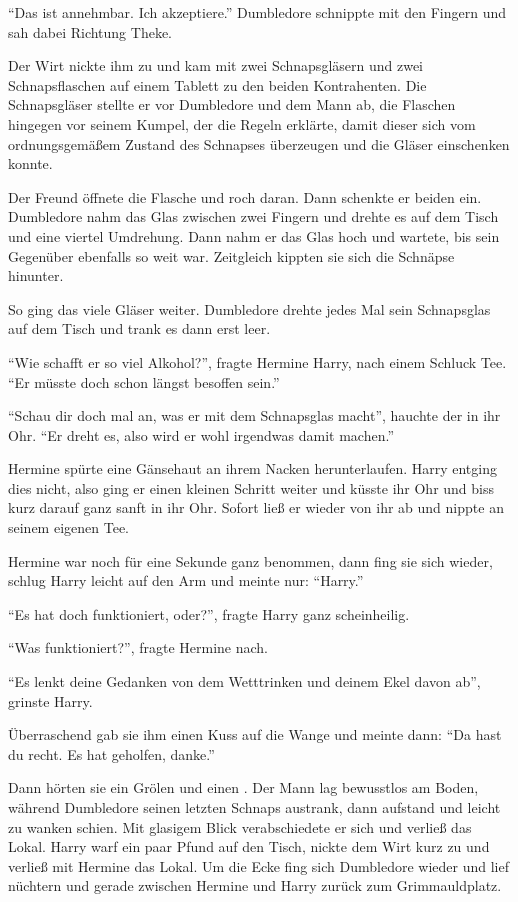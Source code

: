 \enquote{Das ist annehmbar. Ich akzeptiere.} Dumbledore schnippte mit den Fingern und sah dabei Richtung Theke.

Der Wirt nickte ihm zu und kam mit zwei Schnapsgläsern und zwei Schnapsflaschen auf einem Tablett zu den beiden Kontrahenten. Die Schnapsgläser stellte er vor Dumbledore und dem Mann ab, die Flaschen hingegen vor seinem Kumpel, der die Regeln erklärte, damit dieser sich vom ordnungsgemäßem Zustand des Schnapses überzeugen und die Gläser einschenken konnte.

Der Freund öffnete die Flasche und roch daran. Dann schenkte er beiden ein. Dumbledore nahm das Glas zwischen zwei Fingern und drehte es auf dem Tisch und eine viertel Umdrehung. Dann nahm er das Glas hoch und wartete, bis sein Gegenüber ebenfalls so weit war. Zeitgleich kippten sie sich die Schnäpse hinunter.

So ging das viele Gläser weiter. Dumbledore drehte jedes Mal sein Schnapsglas auf dem Tisch und trank es dann erst leer.

\enquote{Wie schafft er so viel Alkohol?}, fragte Hermine Harry, nach einem Schluck Tee. \enquote{Er müsste doch schon längst besoffen sein.}

\enquote{Schau dir doch mal an, was er mit dem Schnapsglas macht}, hauchte der in ihr Ohr. \enquote{Er dreht es, also wird er wohl irgendwas damit machen.}

Hermine spürte eine Gänsehaut an ihrem Nacken herunterlaufen. Harry entging dies nicht, also ging er einen kleinen Schritt weiter und küsste ihr Ohr und biss kurz darauf ganz sanft in ihr Ohr. Sofort ließ er wieder von ihr ab und nippte an seinem eigenen Tee.

Hermine war noch für eine Sekunde ganz benommen, dann fing sie sich wieder, schlug Harry leicht auf den Arm und meinte nur: \enquote{Harry.}

\enquote{Es hat doch funktioniert, oder?}, fragte Harry ganz scheinheilig.

\enquote{Was funktioniert?}, fragte Hermine nach.

\enquote{Es lenkt deine Gedanken von dem Wetttrinken und deinem Ekel davon ab}, grinste Harry.

Überraschend gab sie ihm einen Kuss auf die Wange und meinte dann: \enquote{Da hast du recht. Es hat geholfen, danke.}

Dann hörten sie ein Grölen und einen . Der Mann lag bewusstlos am Boden, während Dumbledore seinen letzten Schnaps austrank, dann aufstand und leicht zu wanken schien. Mit glasigem Blick verabschiedete er sich und verließ das Lokal. Harry warf ein paar Pfund auf den Tisch, nickte dem Wirt kurz zu und verließ mit Hermine das Lokal. Um die Ecke fing sich Dumbledore wieder und lief nüchtern und gerade zwischen Hermine und Harry zurück zum Grimmauldplatz.

